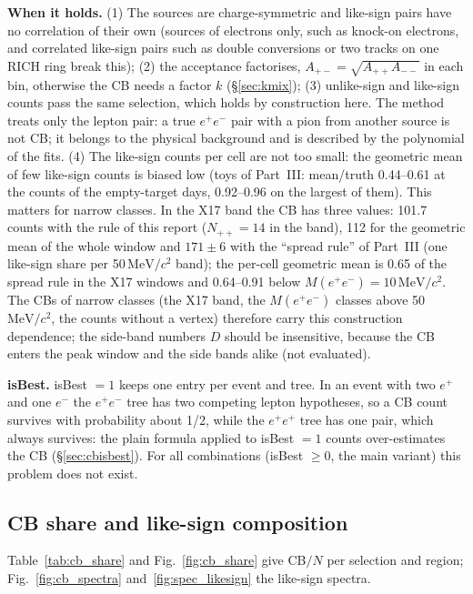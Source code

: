 \documentclass[11pt,a4paper]{article}
\newcommand{\ee}{\ensuremath{e^{+}e^{-}}\xspace}
\newcommand{\Mee}{\ensuremath{M(e^{+}e^{-})}\xspace}
\newcommand{\MeVcc}{\ensuremath{\mathrm{MeV}/c^{2}}\xspace}
\begin{document}
\textbf{When it holds.} (1) The sources are charge-symmetric and like-sign pairs have no correlation of their own
(sources of electrons only, such as knock-on electrons, and correlated like-sign pairs such as double conversions
or two tracks on one RICH ring break this); (2) the acceptance factorises, $A_{+-}=\sqrt{A_{++}A_{--}}$ in each bin,
otherwise the CB needs a factor $k$ (\S\ref{sec:kmix}); (3) unlike-sign and like-sign counts pass the same selection,
which holds by construction here. The method treats only the lepton pair: a true \ee pair with a pion from another
source is not CB; it belongs to the physical background and is described by the polynomial of the fits. (4) The like-sign counts per
cell are not too small: the geometric mean of few like-sign counts is biased low (toys of Part~III: mean/truth 0.44--0.61 at the counts of
the empty-target days, 0.92--0.96 on the largest of them). This matters for narrow classes. In the X17 band the CB has three values:
101.7 counts with the rule of this report ($N_{++}=14$ in the band), 112 for the geometric mean of the whole window and $171\pm6$ with the
``spread rule'' of Part~III (one like-sign share per 50\,\MeVcc band); the per-cell geometric mean is 0.65 of the spread rule in the X17
windows and 0.64--0.91 below $\Mee=10$\,\MeVcc. The CBs of narrow classes (the X17 band, the \Mee classes above 50\,\MeVcc, the counts
without a vertex) therefore carry this construction dependence; the side-band numbers $D$ should be insensitive, because the CB enters
the peak window and the side bands alike (not evaluated).

\textbf{isBest.} isBest $=1$ keeps one entry per event and tree. In an event with two $e^+$ and one $e^-$ the \ee tree
has two competing lepton hypotheses, so a CB count survives with probability about 1/2, while the $e^+e^+$ tree has one
pair, which always survives: the plain formula applied to isBest $=1$ counts over-estimates the CB
(\S\ref{sec:cbisbest}). For all combinations (isBest $\ge0$, the main variant) this problem does not exist.

\subsection{CB share and like-sign composition}
\label{sec:cbshare}
Table~\ref{tab:cb_share} and Fig.~\ref{fig:cb_share} give CB$/N$ per selection and region; Fig.~\ref{fig:cb_spectra}
and~\ref{fig:spec_likesign} the like-sign spectra.
\end{document}
